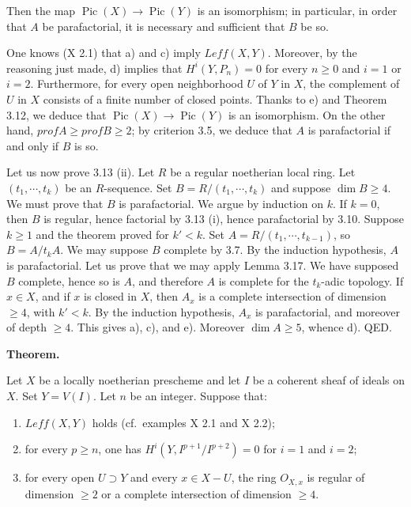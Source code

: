 \documentclass[
  11pt,
  a4paper,
]{book}
\providecommand{\tightlist}{%
  \setlength{\itemsep}{0pt}\setlength{\parskip}{0pt}}
\begin{document}
Then the map \(\operatorname{Pic}(X) \to \operatorname{Pic}(Y)\) is an
isomorphism; in particular, in order that \(A\) be parafactorial, it is
necessary and sufficient that \(B\) be so.

One knows (X 2.1) that a) and c) imply \(Leff(X, Y)\). Moreover, by the
reasoning just made, d) implies that \(H^{i}(Y,
P_{n}) = 0\) for every \(n \geqslant 0\) and \(i = 1\) or \(i = 2\).
Furthermore, for every open neighborhood \(U\) of \(Y\) in \(X\), the
complement of \(U\) in \(X\) consists of a finite number of closed
points. Thanks to e) and Theorem 3.12, we deduce that
\(\operatorname{Pic}(X) \to \operatorname{Pic}(Y)\) is an isomorphism.
On the other hand, \(prof A \geqslant prof B
\geqslant 2\); by criterion 3.5, we deduce that \(A\) is parafactorial
if and only if \(B\) is so.

Let us now prove 3.13 (ii). Let \(R\) be a regular noetherian local
ring. Let \((t_{1}, \cdots, t_{k})\) be an \(R\)-sequence. Set
\(B = R/(t_{1}, \cdots, t_{k})\) and suppose \(\dim B \geqslant 4\). We
must prove that \(B\) is parafactorial. We argue by induction on \(k\).
If \(k = 0\), then \(B\) is regular, hence factorial by 3.13 (i), hence
parafactorial by 3.10. Suppose \(k \geqslant 1\) and the theorem proved
for \(k' < k\). Set \(A = R/(t_{1}, \cdots, t_{k-1})\), so
\(B = A/t_{k} A\). We may suppose \(B\) complete by 3.7. By the
induction hypothesis, \(A\) is parafactorial. Let us prove that we may
apply Lemma 3.17. We have supposed \(B\) complete, hence so is \(A\),
and therefore \(A\) is complete for the \(t_{k}\)-adic topology. If \(x
\in X\), and if \(x\) is closed in \(X\), then \(A_{x}\) is a complete
intersection of dimension \(\geqslant 4\), with \(k' < k\). By the
induction hypothesis, \(A_{x}\) is parafactorial, and moreover of depth
\(\geqslant 4\). This gives a), c), and e). Moreover
\(\dim A \geqslant 5\), whence d). QED.

\textbf{Theorem.}

Let \(X\) be a locally noetherian prescheme and let \(I\) be a coherent
sheaf of ideals on \(X\). Set \(Y = V(I)\). Let \(n\) be an integer.
Suppose that:

\begin{enumerate}
\def\labelenumi{\arabic{enumi}.}
\tightlist
\item
  \(Leff(X, Y)\) holds (cf.~examples X 2.1 and X 2.2);
\item
  for every \(p \geqslant n\), one has \(H^{i}(Y, I^{p+1}/I^{p+2}) = 0\)
  for \(i = 1\) and \(i = 2\);
\item
  for every open \(U \supset Y\) and every \(x \in X - U\), the ring
  \(O_{X,x}\) is regular of dimension \(\geqslant 2\) or a complete
  intersection of dimension \(\geqslant 4\).
\end{enumerate}
\end{document}
